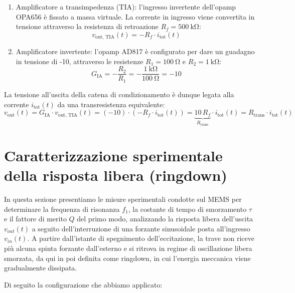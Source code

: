 \documentclass[11pt,a4paper]{article}
\begin{document}
\begin{enumerate}
    \item 
    Amplificatore a transimpedenza (TIA): l'ingresso invertente dell'opamp OPA656 è fissato a massa virtuale. La corrente in ingresso viene convertita in tensione attraverso la resistenza di retroazione $R_f=\SI{500}{\kilo\ohm}$:
    \begin{equation}
        v_{\text{out, TIA}}(t) = - R_f \cdot i_{\text{tot}}(t)
    \end{equation}
    \item 
    Amplificatore invertente: l'opamp AD817 è configurato per dare un guadagno in tensione di -10, attraverso le resistenze $R_1 = \SI{100}{\ohm}$ e $R_2 = \SI{1}{\kilo\ohm}$:
    \begin{equation}
        G_{\text{IA}} = -\frac{R_2}{R_1} = -\frac{\SI{1}{\kilo\ohm}}{\SI{100}{\ohm}} = -10
    \end{equation}
\end{enumerate}

\noindent La tensione all'uscita della catena di condizionamento è dunque legata alla corrente $i_{\text{tot}}(t)$ da una transresistenza equivalente:
\begin{equation}
    \label{eq:transresistenza_totale}
    v_{\text{out}}(t) = G_{\text{IA}} \cdot v_{\text{out, TIA}}(t) = (-10) \cdot \left( -R_f \cdot i_{\text{tot}}(t) \right) = \underbrace{10 \, R_f}_{R_{\text{trans}}} \cdot i_{\text{tot}}(t) = R_{\text{trans}} \cdot i_{\text{tot}}(t)
\end{equation}

\newpage
\section{Caratterizzazione sperimentale della risposta libera (ringdown)}
\label{sec:ringdown}

In questa sezione presentiamo le misure sperimentali condotte sul MEMS per determinare la frequenza di risonanza $f_1$, la costante di tempo di smorzamento $\tau$ e il fattore di merito $Q$ del primo modo, analizzando la risposta libera dell'uscita $v_{out}(t)$ a seguito dell'interruzione di una forzante sinusoidale posta all'ingresso $v_{in}(t)$. A partire dall'istante di spegnimento dell'eccitazione, la trave non riceve più alcuna spinta forzante dall'esterno e si ritrova in regime di oscillazione libera smorzata, da qui in poi definita come ringdown, in cui l'energia meccanica viene gradualmente dissipata.

\vspace{0.3cm}
\noindent Di seguito la configurazione che abbiamo applicato:
\end{document}
